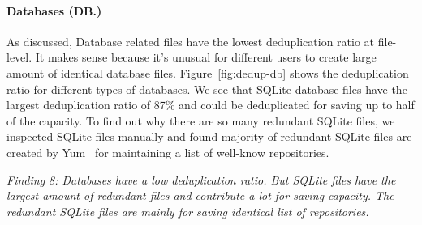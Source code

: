 
\paragraph{Databases (DB.)}

As discussed, Database related files have the lowest deduplication ratio at file-level. It makes sense because it's unusual for different users to create large amount of identical database files. Figure~\ref{fig:dedup-db} shows the deduplication ratio for different types of databases. We see that SQLite database files have the largest deduplication ratio of 87\% and could be deduplicated for saving up to half of the capacity. To find out why there are so many redundant SQLite files, we inspected SQLite files manually and found majority of redundant SQLite files are created by Yum~\cite{xxx} for maintaining a list of well-know repositories.

\textit{Finding 8: Databases have a low deduplication ratio. But SQLite files have the largest amount of redundant files and contribute a lot for saving capacity. The redundant SQLite files are mainly for saving identical list of repositories.}


%


